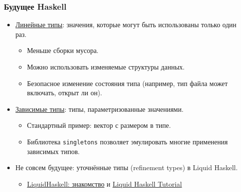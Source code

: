 \documentclass[11pt]{beamer}
\begin{document}
\begin{frame}[fragile]
\frametitle{Будущее Haskell}
\begin{itemize}
    \item \href{https://www.tweag.io/posts/2017-03-13-linear-types.html}{Линейные типы}: значения, которые могут быть использованы только один раз.
    \begin{itemize}
        \item Меньше сборки мусора.
        \item Можно использовать изменяемые структуры данных.
        \item Безопасное изменение состояния типа (например, тип файла может включать, открыт ли он).
    \end{itemize}
    \pause
    \item \href{https://serokell.io/blog/2018/12/17/why-dependent-haskell}{Зависимые типы}: типы, параметризованные значениями.
        \begin{itemize}
            \item Стандартный пример: вектор с размером в типе.
            \item Библиотека \lstinline|singletons| позволяет эмулировать многие применения зависимых типов.
        \end{itemize}
    \pause
    \item Не совсем будущее: уточнённые типы (refinement types) в Liquid Haskell.
        \begin{itemize}
            \item \href{https://ruhaskell.org/posts/utils/2016/12/16/liquidhaskell-hello.html}{LiquidHaskell: знакомство} и \href{https://liquid.kosmikus.org/}{Liquid Haskell Tutorial}
        \end{itemize}
\end{itemize}
\end{frame}
\end{document}
